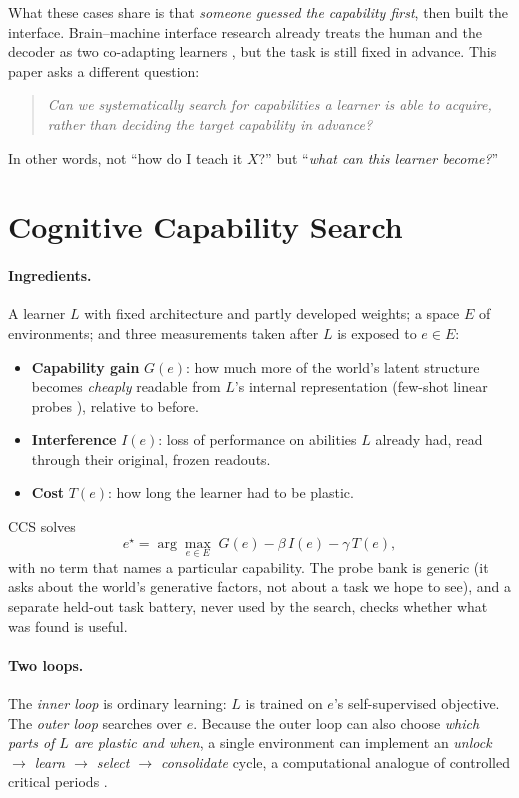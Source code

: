 \documentclass[11pt]{article}
\begin{document}
What these cases share is that \emph{someone guessed the capability first}, then built the
interface. Brain--machine interface research already treats the human and the decoder as two
co-adapting learners \cite{shenoy2014,perdikis2020}, but the task is still fixed in advance. This
paper asks a different question:
\begin{quote}
\emph{Can we systematically search for capabilities a learner is able to acquire, rather than
deciding the target capability in advance?}
\end{quote}
In other words, not ``how do I teach it $X$?'' but ``\emph{what can this learner become?}''

\section{Cognitive Capability Search}
\paragraph{Ingredients.} A learner $L$ with fixed architecture and partly developed weights; a
space $E$ of environments; and three measurements taken after $L$ is exposed to $e\in E$:
\begin{itemize}\itemsep0pt
\item \textbf{Capability gain} $G(e)$: how much more of the world's latent structure becomes
  \emph{cheaply} readable from $L$'s internal representation (few-shot linear probes
  \cite{alain2016}), relative to before.
\item \textbf{Interference} $I(e)$: loss of performance on abilities $L$ already had, read through
  their original, frozen readouts.
\item \textbf{Cost} $T(e)$: how long the learner had to be plastic.
\end{itemize}
CCS solves
\begin{equation}
e^\star=\arg\max_{e\in E}\; G(e)-\beta\, I(e)-\gamma\, T(e),
\end{equation}
with no term that names a particular capability. The probe bank is generic (it asks about the
world's generative factors, not about a task we hope to see), and a separate held-out task
battery, never used by the search, checks whether what was found is useful.

\paragraph{Two loops.} The \emph{inner loop} is ordinary learning: $L$ is trained on $e$'s
self-supervised objective. The \emph{outer loop} searches over $e$. Because the outer loop can
also choose \emph{which parts of $L$ are plastic and when}, a single environment can implement an
\emph{unlock $\to$ learn $\to$ select $\to$ consolidate} cycle, a computational analogue of
controlled critical periods \cite{hensch2005}.
\end{document}

